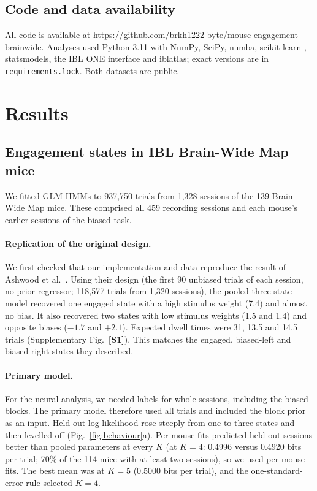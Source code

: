 \documentclass[11pt]{article}
\newcommand{\todo}[1]{\textbf{[#1]}}
\begin{document}
\subsection{Code and data availability}
All code is available at \url{https://github.com/brkh1222-byte/mouse-engagement-brainwide}. Analyses used Python 3.11 with NumPy, SciPy, numba, scikit-learn \citep{pedregosa2011}, statsmodels, the IBL ONE interface and iblatlas; exact versions are in \texttt{requirements.lock}. Both datasets are public.

\section{Results}
\subsection{Engagement states in IBL Brain-Wide Map mice}
We fitted GLM-HMMs to 937,750 trials from 1,328 sessions of the 139 Brain-Wide Map mice. These comprised all 459 recording sessions and each mouse's earlier sessions of the biased task.

\paragraph{Replication of the original design.} We first checked that our implementation and data reproduce the result of Ashwood et al.\ \citep{ashwood2022}. Using their design (the first 90 unbiased trials of each session, no prior regressor; 118,577 trials from 1,320 sessions), the pooled three-state model recovered one engaged state with a high stimulus weight (7.4) and almost no bias. It also recovered two states with low stimulus weights (1.5 and 1.4) and opposite biases ($-1.7$ and $+2.1$). Expected dwell times were 31, 13.5 and 14.5 trials (Supplementary Fig.~\todo{S1}). This matches the engaged, biased-left and biased-right states they described.

\paragraph{Primary model.} For the neural analysis, we needed labels for whole sessions, including the biased blocks. The primary model therefore used all trials and included the block prior as an input. Held-out log-likelihood rose steeply from one to three states and then levelled off (Fig.~\ref{fig:behaviour}a). Per-mouse fits predicted held-out sessions better than pooled parameters at every $K$ (at $K=4$: 0.4996 versus 0.4920 bits per trial; 70\% of the 114 mice with at least two sessions), so we used per-mouse fits. The best mean was at $K=5$ (0.5000 bits per trial), and the one-standard-error rule selected $K=4$.
\end{document}
